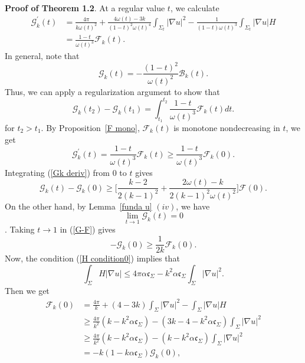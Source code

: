 \documentclass[12pt]{article}
\theoremstyle{definition}
\theoremstyle{plain}
\numberwithin{equation}{section}
\begin{document}
\textbf{Proof of Theorem 1.2}.
At a regular value $ t $, we calculate
\begin{equation}\label{G derF}
\begin{aligned}
\mathcal{G}_{k}^{\prime}(t)&=\frac{4\pi}{k\omega(t)^{2}}+\frac{4\omega(t)-3k}{(1-t)^{2}\omega(t)^{4}}\int_{\Sigma_{t}}|\nabla u|^{2}-\frac{1}{(1-t)\omega(t)^{3}}\int_{\Sigma_{t}}|\nabla u|H\\
&=\frac{1-t}{\omega(t)^{3}}\mathcal{F}_{k}(t).
\end{aligned}
\end{equation}
In general, note that 
$$
\mathcal{G}_{k}(t)=-\frac{(1-t)^{2}}{\omega(t)^{2}}\mathcal{B}_{k}(t).
$$
Thus, we can apply a regularization argument to show that 
$$
\mathcal{G}_{k}(t_{2})-\mathcal{G}_{k}(t_{1})=\int_{t_{1}}^{t_{2}}\frac{1-t}{\omega(t)^{3}}\mathcal{F}_{k}(t)dt.
$$
for $ t_{2}>t_{1} $.
By Proposition~\ref{F mono}, $ \mathcal{F}_{k}(t) $ is monotone nondecreasing in $ t $, we get
\begin{equation}\label{Gk deriv}
\mathcal{G}_{k}^{\prime}(t)=\frac{1-t}{\omega(t)^{3}}\mathcal{F}_{k}(t)\geq \frac{1-t}{\omega(t)^{3}}\mathcal{F}_{k}(0).
\end{equation}
Integrating (\ref{Gk deriv}) from $ 0 $ to $ t $ gives 
\begin{equation}\label{G-F}
\mathcal{G}_{k}(t)-\mathcal{G}_{k}(0)\geq \Big[\frac{k-2}{2(k-1)^{2}}+\frac{2\omega(t)-k}{2(k-1)^{2}\omega(t)^{2}}\Big]\mathcal{F}(0).
\end{equation}
On the other hand, by Lemma~\ref{funda u} $ (iv) $, we have 
$$ 
\lim\limits_{t\to 1}\mathcal{G}_{k}(t)=0 
$$. 
Taking $ t \to 1 $ in (\ref{G-F}) gives
\begin{equation}\label{GF1}
-\mathcal{G}_{k}(0)\geq \frac{1}{2k}\mathcal{F}_{k}(0).
\end{equation}
Now, the condition (\ref{H condition0}) implies that 
$$
\int_{\Sigma}H|\nabla u|\leq 4\pi \alpha \mathfrak{c}_{\Sigma}-k^{2}\alpha \mathfrak{c}_{\Sigma}\int_{\Sigma}|\nabla u|^{2}.
$$
Then we get 
\begin{equation}\label{GF2}
\begin{aligned}
\mathcal{F}_{k}(0)&=\frac{4\pi}{k}+(4-3k)\int_{\Sigma}|\nabla u|^{2}-\int_{\Sigma}|\nabla u|H\\
&\geq \frac{4\pi}{k^{2}}(k-k^{2}\alpha \mathfrak{c}_{\Sigma})-(3k-4-k^{2}\alpha \mathfrak{c}_{\Sigma})\int_{\Sigma}|\nabla u|^{2}\\
&\geq \frac{4\pi}{k^{2}}(k-k^{2}\alpha \mathfrak{c}_{\Sigma})-(k-k^{2}\alpha \mathfrak{c}_{\Sigma})\int_{\Sigma}|\nabla u|^{2}\\
&=-k(1-k\alpha\mathfrak{c}_{\Sigma})\mathcal{G}_{k}(0),
\end{aligned}
\end{equation}
\end{document}
